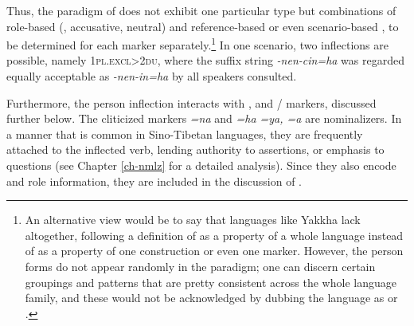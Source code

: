 Thus, the paradigm of  does not exhibit one particular  type but combinations of role-based (, accusative, neutral) and reference-based or even scenario-based , to be determined for each marker separately.\footnote{An alternative view would be to say that languages like Yakkha lack  altogether, following a definition of  as a property of a whole language instead of as a property of one construction or even one marker. However, the person forms do not appear randomly in the paradigm; one can discern certain groupings and patterns that are pretty consistent across the whole language family, and these would not be acknowledged by dubbing the language as  or .} In one scenario, two inflections are possible, namely {\scshape 1pl.excl>2du}, where the suffix string \emph{-nen-cin=ha} was regarded equally acceptable as \emph{-nen-in=ha} by all speakers consulted. 
 
Furthermore, the person inflection interacts with ,  and / markers, discussed further below. The cliticized markers  \emph{=na} and \emph{=ha \ti =ya, \ti =a} are nominalizers. In a manner that is common in Sino-Tibetan languages, they are frequently attached to the inflected verb, lending authority to assertions, or emphasis to questions (see Chapter \ref{ch-nmlz} for a detailed analysis). Since they also encode  and role information, they are included in the discussion of . 


